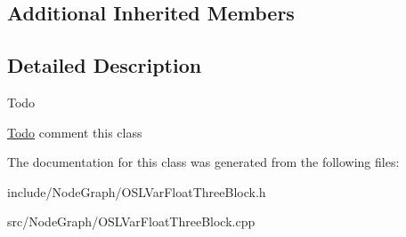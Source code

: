 \subsection*{Additional Inherited Members}


\subsection{Detailed Description}
\begin{DoxyRefDesc}{Todo}
\item[\hyperlink{todo__todo000009}{Todo}]comment this class \end{DoxyRefDesc}


The documentation for this class was generated from the following files\-:\begin{DoxyCompactItemize}
\item 
include/\-Node\-Graph/O\-S\-L\-Var\-Float\-Three\-Block.\-h\item 
src/\-Node\-Graph/O\-S\-L\-Var\-Float\-Three\-Block.\-cpp\end{DoxyCompactItemize}
